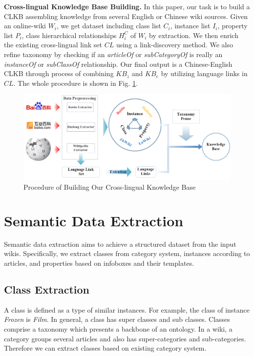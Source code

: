 \documentclass[runningheads,a4paper]{llncs}
\newcommand{\para}[1]{\vspace{0.1cm}\noindent\textbf{#1}}
\begin{document}
\para{Cross-lingual Knowledge Base Building.} In this paper, our task is to build a CLKB assembling knowledge from several English or Chinese wiki sources. Given an online-wiki $W_{i}$, we get dataset including class list $C_{i}$, instance list $I_{i}$, property list $P_{i}$, class hierarchical relationships $H^C_{i}$ of $W_{i}$ by extraction. We then enrich the existing cross-lingual link set $CL$ using a link-discovery method. We also refine taxonomy by checking if an \textit{articleOf} or \textit{subCategoryOf} is really an \textit{instanceOf} or \textit{subClassOf} relationship. Our final output is a Chinese-English CLKB through process of combining $KB_{z}$ and $KB_{e}$ by utilizing language links in $CL$. The whole procedure is shown in Fig. \ref{fig:procedure}. 

\begin{figure}[ht]
    \centerline{\includegraphics[width=1\columnwidth]{fig/procedure2}}
    \caption{Procedure of Building Our Cross-lingual Knowledge Base}
    \label{fig:procedure}
\end{figure}

\section{Semantic Data Extraction}
\label{sec:sde}
Semantic data extraction aims to achieve a structured dataset from the input wikis. Specifically, we extract classes from category system, instances according to articles, and properties based on infoboxes and their templates.

\subsection{Class Extraction}
\label{sec:ce}
A class is defined as a type of similar instances. For example, the class of instance \emph{Frozen} is \emph{Film}. In general, a class has super classes and sub classes. Classes comprise a taxonomy which presents a backbone of an ontology. In a wiki, a category groups several articles and also has super-categories and sub-categories. Therefore we can extract classes based on existing category system.
\end{document}
